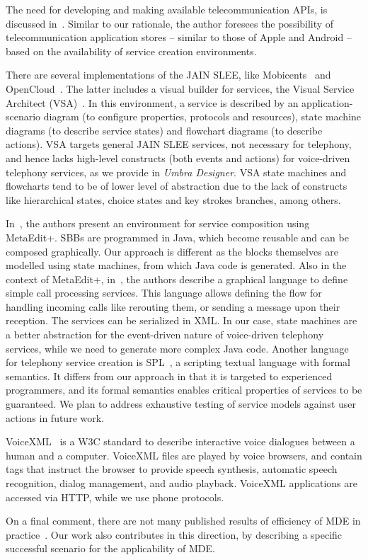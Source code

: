 The need for developing and making available telecommunication APIs, is discussed in~\cite{5640901}. Similar to our rationale, the author
foresees the possibility of telecommunication application stores -- similar to those of Apple and Android -- based on the availability of service creation environments. 

There are several implementations of the JAIN SLEE, like Mobicents~\cite{Mobicents} and
OpenCloud~\cite{rhino}. The latter includes a visual builder for services, the
Visual Service Architect (VSA)~\cite{VSA}. In this environment, a service is described by an application-scenario diagram (to configure properties, protocols and
resources), state machine diagrams (to describe service states) and flowchart diagrams (to describe actions). VSA targets general JAIN SLEE 
services, not necessary for telephony, and hence lacks high-level constructs (both events and actions) for voice-driven telephony services, as we 
provide in {\em Umbra Designer}. VSA state
machines and flowcharts tend to be of lower level of abstraction due to the lack of constructs like hierarchical states, choice states and key strokes
branches, among others.

In~\cite{ICT}, the authors present an environment for service composition using MetaEdit+. SBBs are programmed 
in Java, which become reusable and can be composed graphically. Our approach is different as the blocks themselves 
are modelled using state machines, from which Java code is generated. Also in the context of MetaEdit+, in~\cite{DSVLs}, 
the authors describe a graphical language to define simple call processing services. This language allows defining the 
flow for handling incoming calls like rerouting them, or sending a message upon their reception. The services can be 
serialized in XML. In our case, state machines are a better abstraction for the event-driven nature of voice-driven 
telephony services, while we need to generate more complex Java code. Another language for telephony service 
creation is SPL~\cite{palix:inria-00196520}, a scripting textual language with formal semantics. It differs from our
approach in that it is targeted to experienced programmers, and its formal semantics enables critical properties of services 
to be guaranteed. We plan to address exhaustive testing of service models against user actions in future work.

VoiceXML~\cite{VoiceXML} is a W3C standard to describe interactive voice dialogues between a human and a computer. VoiceXML files
are played by voice browsers, and contain tags that instruct the browser to provide speech synthesis, automatic speech recognition, 
dialog management, and audio playback. VoiceXML applications are accessed via HTTP, while we use phone protocols.

On a final comment, there are not many published results of efficiency of MDE in practice~\cite{HutchinsonWRK11,DSVLs}. 
Our work also contributes in this direction, by describing a specific successful scenario for the applicability of MDE.

